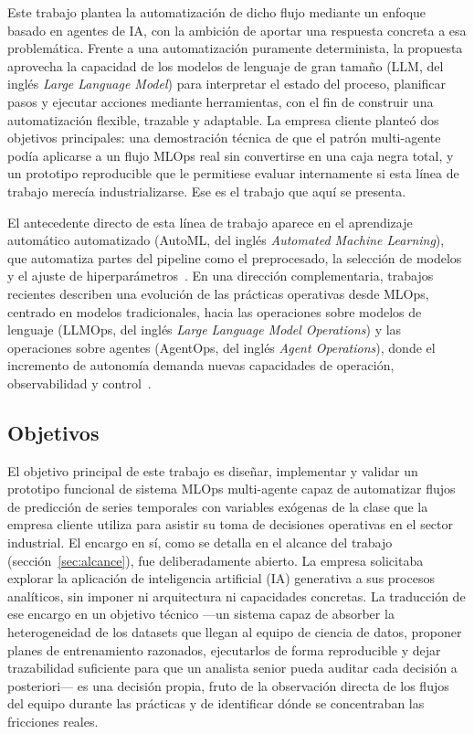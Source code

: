 \documentclass[12pt,a4paper]{article}
\theoremstyle{plain}
\begin{document}
Este trabajo plantea la automatización de dicho flujo mediante un enfoque basado en agentes de IA, con la ambición de aportar una respuesta concreta a esa problemática. Frente a una automatización puramente determinista, la propuesta aprovecha la capacidad de los modelos de lenguaje de gran tamaño (LLM, del inglés \emph{Large Language Model}) para interpretar el estado del proceso, planificar pasos y ejecutar acciones mediante herramientas, con el fin de construir una automatización flexible, trazable y adaptable. %
La empresa cliente planteó dos objetivos principales: una demostración técnica de que el patrón multi-agente podía aplicarse a un flujo MLOps real sin convertirse en una caja negra total, y un prototipo reproducible que le permitiese evaluar internamente si esta línea de trabajo merecía industrializarse. Ese es el trabajo que aquí se presenta.

El antecedente directo de esta línea de trabajo aparece en el aprendizaje automático automatizado (AutoML, del inglés \emph{Automated Machine Learning}), que automatiza partes del pipeline como el preprocesado, la selección de modelos y el ajuste de hiperparámetros~\cite{he2021automl}. En una dirección complementaria, trabajos recientes describen una evolución de las prácticas operativas desde MLOps, centrado en modelos tradicionales, hacia las operaciones sobre modelos de lenguaje (LLMOps, del inglés \emph{Large Language Model Operations}) y las operaciones sobre agentes (AgentOps, del inglés \emph{Agent Operations}), donde el incremento de autonomía demanda nuevas capacidades de operación, observabilidad y control~\cite{ganesh2024mlopsllmopsagentops}. %

\subsection{Objetivos}

El objetivo principal de este trabajo es diseñar, implementar y validar un prototipo funcional de sistema MLOps multi-agente capaz de automatizar flujos de predicción de series temporales con variables exógenas de la clase que la empresa cliente utiliza para asistir su toma de decisiones operativas en el sector industrial. El encargo en sí, como se detalla en el alcance del trabajo (sección~\ref{sec:alcance}), fue deliberadamente abierto. La empresa solicitaba explorar la aplicación de inteligencia artificial (IA) generativa a sus procesos analíticos, sin imponer ni arquitectura ni capacidades concretas. La traducción de ese encargo en un objetivo técnico ---un sistema capaz de absorber la heterogeneidad de los datasets que llegan al equipo de ciencia de datos, proponer planes de entrenamiento razonados, ejecutarlos de forma reproducible y dejar trazabilidad suficiente para que un analista senior pueda auditar cada decisión a posteriori--- es una decisión propia, fruto de la observación directa de los flujos del equipo durante las prácticas y de identificar dónde se concentraban las fricciones reales.
\end{document}
